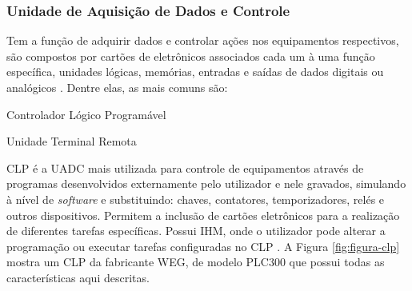    \subsubsection{Unidade de Aquisição de Dados e Controle}
    \label{sec:uadc}

        Tem a função de adquirir dados e controlar ações nos equipamentos respectivos, são compostos por cartões de eletrônicos associados cada um à uma função específica, unidades lógicas, memórias,  entradas e saídas de dados digitais ou analógicos \cite{mamede-instalacoes}. Dentre elas, as mais comuns são:
        
        \begin{alineascomponto}
        	\item Controlador Lógico Programável
        	\item Unidade Terminal Remota
        \end{alineascomponto}

    \label{sec:clp}

       \gls{CLP} é a \gls{UADC} mais utilizada para controle de equipamentos através de programas desenvolvidos externamente pelo utilizador e nele gravados, simulando à nível de \textit{software} e substituindo: chaves, contatores, temporizadores, relés e outros dispositivos. Permitem a inclusão de cartões eletrônicos para a realização de diferentes tarefas específicas. Possui \gls{IHM}, onde o utilizador pode alterar a programação ou executar tarefas configuradas no \gls{CLP} \cite{mamede-instalacoes}. A Figura \ref{fig:figura-clp} mostra um \gls{CLP} da fabricante WEG, de modelo PLC300 que possui todas as características aqui descritas.
       
        \begin{figure}[!h]
	    \end{figure}
	    
